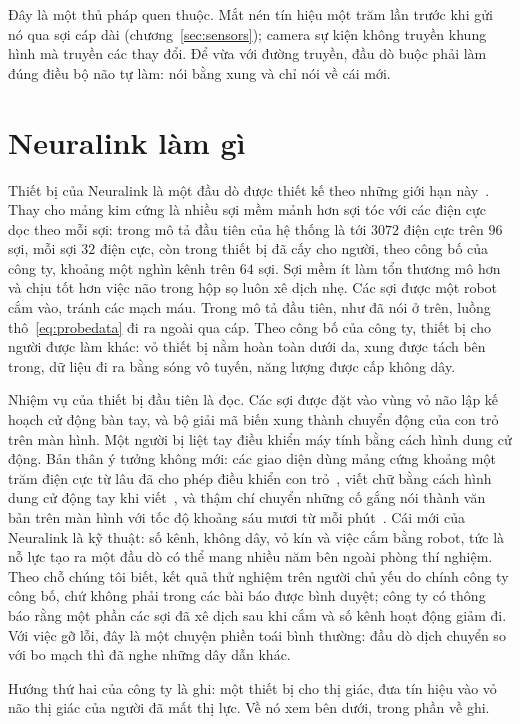 Đây là một thủ pháp quen thuộc. Mắt nén tín hiệu một trăm lần trước khi gửi nó qua sợi cáp dài (chương~\ref{sec:sensors}); camera sự kiện không truyền khung hình mà truyền các thay đổi. Để vừa với đường truyền, đầu dò buộc phải làm đúng điều bộ não tự làm: nói bằng xung và chỉ nói về cái mới.

\section{Neuralink làm gì}

Thiết bị của Neuralink là một đầu dò được thiết kế theo những giới hạn này~\cite{Musk2019}. Thay cho mảng kim cứng là nhiều sợi mềm mảnh hơn sợi tóc với các điện cực dọc theo mỗi sợi: trong mô tả đầu tiên của hệ thống là tới $3072$ điện cực trên $96$ sợi, mỗi sợi $32$ điện cực, còn trong thiết bị đã cấy cho người, theo công bố của công ty, khoảng một nghìn kênh trên $64$ sợi. Sợi mềm ít làm tổn thương mô hơn và chịu tốt hơn việc não trong hộp sọ luôn xê dịch nhẹ. Các sợi được một robot cắm vào, tránh các mạch máu. Trong mô tả đầu tiên, như đã nói ở trên, luồng thô~\eqref{eq:probedata} đi ra ngoài qua cáp. Theo công bố của công ty, thiết bị cho người được làm khác: vỏ thiết bị nằm hoàn toàn dưới da, xung được tách bên trong, dữ liệu đi ra bằng sóng vô tuyến, năng lượng được cấp không dây.

Nhiệm vụ của thiết bị đầu tiên là đọc. Các sợi được đặt vào vùng vỏ não lập kế hoạch cử động bàn tay, và bộ giải mã biến xung thành chuyển động của con trỏ trên màn hình. Một người bị liệt tay điều khiển máy tính bằng cách hình dung cử động. Bản thân ý tưởng không mới: các giao diện dùng mảng cứng khoảng một trăm điện cực từ lâu đã cho phép điều khiển con trỏ~\cite{Hochberg2006}, viết chữ bằng cách hình dung cử động tay khi viết~\cite{Willett2021}, và thậm chí chuyển những cố gắng nói thành văn bản trên màn hình với tốc độ khoảng sáu mươi từ mỗi phút~\cite{Willett2023}. Cái mới của Neuralink là kỹ thuật: số kênh, không dây, vỏ kín và việc cắm bằng robot, tức là nỗ lực tạo ra một đầu dò có thể mang nhiều năm bên ngoài phòng thí nghiệm. Theo chỗ chúng tôi biết, kết quả thử nghiệm trên người chủ yếu do chính công ty công bố, chứ không phải trong các bài báo được bình duyệt; công ty có thông báo rằng một phần các sợi đã xê dịch sau khi cắm và số kênh hoạt động giảm đi. Với việc gỡ lỗi, đây là một chuyện phiền toái bình thường: đầu dò dịch chuyển so với bo mạch thì đã nghe những dây dẫn khác.

Hướng thứ hai của công ty là ghi: một thiết bị cho thị giác, đưa tín hiệu vào vỏ não thị giác của người đã mất thị lực. Về nó xem bên dưới, trong phần về ghi.


